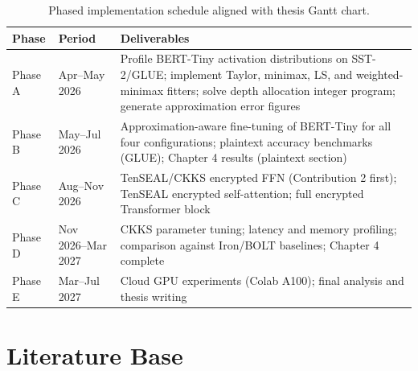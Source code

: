 \documentclass[12pt, a4paper]{article}
\begin{document}
\begin{table}[ht]
\centering
\caption{Phased implementation schedule aligned with thesis Gantt chart.}
\label{tab:roadmap}
\renewcommand{\arraystretch}{1.3}
\begin{tabularx}{\textwidth}{llX}
\toprule
\textbf{Phase} & \textbf{Period} & \textbf{Deliverables} \\
\midrule
Phase A & Apr--May 2026 &
  Profile BERT-Tiny activation distributions on SST-2/GLUE;
  implement Taylor, minimax, LS, and weighted-minimax fitters;
  solve depth allocation integer program;
  generate approximation error figures \\
Phase B & May--Jul 2026 &
  Approximation-aware fine-tuning of BERT-Tiny for all four configurations;
  plaintext accuracy benchmarks (GLUE);
  Chapter 4 results (plaintext section) \\
Phase C & Aug--Nov 2026 &
  TenSEAL/CKKS encrypted FFN (Contribution 2 first);
  TenSEAL encrypted self-attention;
  full encrypted Transformer block \\
Phase D & Nov 2026--Mar 2027 &
  CKKS parameter tuning;
  latency and memory profiling;
  comparison against Iron/BOLT baselines;
  Chapter 4 complete \\
Phase E & Mar--Jul 2027 &
  Cloud GPU experiments (Colab A100);
  final analysis and thesis writing \\
\bottomrule
\end{tabularx}
\end{table}

\section{Literature Base}
\end{document}

